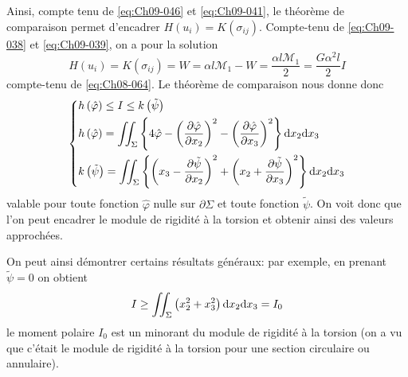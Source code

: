 Ainsi, compte tenu de \eqref{eq:Ch09-046} et \eqref{eq:Ch09-041}, le théorème de comparaison permet d'encadrer $H(u_i) = K(\sigma_{ij})$.
Compte-tenu de \eqref{eq:Ch09-038} et \eqref{eq:Ch09-039}, on a pour la solution 
\begin{equation}
    H(u_i) = K (\sigma_{ij}) = W = \alpha l \mathcal{M}_1 - W = \frac{\alpha l \mathcal{M}_1}{2} = \frac{G\alpha^2 l}{2} I    
    \label{eq:Ch09-047}
\end{equation}
compte-tenu de \eqref{eq:Ch08-064}.
Le théorème de comparaison nous donne donc 
\begin{equation}
    \left\{
    \begin{aligned}
        & h \left( \hat{\varphi} \right) \leq I \leq k \left( \tilde{\psi} \right) \\
        & h \left( \hat{\varphi} \right) = \iint_{\Sigma} \left\{ 4 \hat{\varphi} - \left( \frac{\partial \hat{\varphi}}{\partial x_2} \right)^2 - \left( \frac{\partial \hat{\varphi}}{\partial x_3} \right)^2 \right\} \mathrm{d} x_2 \mathrm{d} x_3 \\
        & k \left( \tilde{\psi} \right) = \iint_{\Sigma} \left\{ \left( x_3 - \frac{\partial \tilde{\psi}}{\partial x_2} \right)^2 + \left( x_2 + \frac{\partial \tilde{\psi}}{\partial x_3} \right)^2 \right\} \mathrm{d} x_2 \mathrm{d} x_3
    \end{aligned}
    \right.
    \label{eq:Ch09-048} 
\end{equation}
valable pour toute fonction $\hat{\varphi}$ nulle sur $\partial \Sigma$ et toute fonction $\tilde{\psi}$.
On voit donc que l'on peut encadrer le module de rigidité à la torsion et obtenir ainsi des valeurs approchées. 

On peut ainsi démontrer certains résultats généraux: par exemple, en prenant $\tilde{\psi} = 0$ on obtient
\begin{equation}
    I \geq \iint_{\Sigma} \left( x_2^2 + x_3^2 \right) \mathrm{d} x_2 \mathrm{d} x_3 = I_0
    \label{eq:Ch09-049}
\end{equation}
le moment polaire $I_0$ est un minorant du module de rigidité à la torsion (on a vu que c'était le module de rigidité à la torsion pour une section circulaire ou annulaire). 

